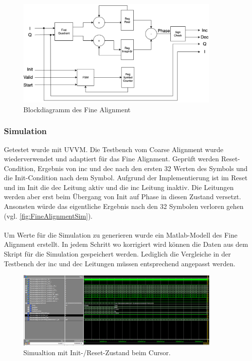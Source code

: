 \begin{figure}[htbp] 
	\centering
	\includegraphics[width=0.9\textwidth]{../img/FineAlignmentBlock.png}
	\caption{Blockdiagramm des Fine Alignment}
	\label{fig:FineAlignmentBlock}
\end{figure}

\subsubsection{Simulation}
Getestet wurde mit UVVM. Die Testbench vom Coarse Alignment wurde wiederverwendet und adaptiert für das Fine Alignment. Geprüft werden Reset-Condition, Ergebnis von inc und dec nach den ersten 32 Werten des Symbols und die Init-Condition nach dem Symbol. Aufgrund der Implementierung ist im Reset und im Init die dec Leitung aktiv und die inc Leitung inaktiv. Die Leitungen werden aber erst beim Übergang von Init auf Phase in diesen Zustand versetzt. Ansonsten würde das eigentliche Ergebnis nach den 32 Symbolen verloren gehen (vgl. \autoref{fig:FineAlignmentSim}).\\
\\
Um Werte für die Simulation zu generieren wurde ein Matlab-Modell des Fine Alignment erstellt. In jedem Schritt wo korrigiert wird können die Daten aus dem Skript für die Simulation gespeichert werden. Lediglich die Vergleiche in der Testbench der inc und dec Leitungen müssen entsprechend angepasst werden.

\begin{figure}[htbp] 
	\centering
	\includegraphics[width=0.9\textwidth]{../img/FineAlignmentSim.png}
	\caption{Simualtion mit Init-/Reset-Zustand beim Cursor.}
	\label{fig:FineAlignmentSim}
\end{figure}


